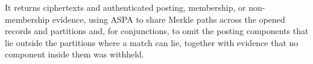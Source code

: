 




It returns ciphertexts and authenticated posting, membership, or non-membership evidence, using ASPA to
share Merkle paths across the opened records and partitions and, for conjunctions, to omit the posting
components that lie outside the partitions where a match can lie, together with evidence that no
component inside them was withheld.


